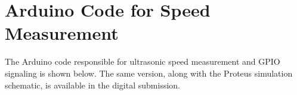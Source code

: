 \chapter{Arduino Code for Speed Measurement} \label{appendix:a}

The Arduino code responsible for ultrasonic speed measurement and GPIO signaling is shown below. The same version, along with the Proteus simulation schematic, is available in the digital submission.


